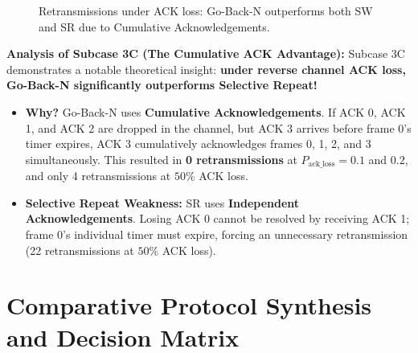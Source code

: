 \documentclass[11pt,a4paper]{article}
\begin{document}
\begin{figure}[H]
\centering
{}
\caption{Retransmissions under ACK loss: Go-Back-N outperforms both SW and SR due to Cumulative Acknowledgements.}
\label{fig:case3c_plot}
\end{figure}

\textbf{Analysis of Subcase 3C (The Cumulative ACK Advantage):}
Subcase 3C demonstrates a notable theoretical insight: \textbf{under reverse channel ACK loss, Go-Back-N significantly outperforms Selective Repeat!}
\begin{itemize}
    \item \textbf{Why?} Go-Back-N uses \textbf{Cumulative Acknowledgements}. If ACK 0, ACK 1, and ACK 2 are dropped in the channel, but ACK 3 arrives before frame 0's timer expires, ACK 3 cumulatively acknowledges frames 0, 1, 2, and 3 simultaneously. This resulted in \textbf{0 retransmissions} at $P_{\text{ack\_loss}} = 0.1$ and $0.2$, and only 4 retransmissions at $50\%$ ACK loss.
    \item \textbf{Selective Repeat Weakness:} SR uses \textbf{Independent Acknowledgements}. Losing ACK 0 cannot be resolved by receiving ACK 1; frame 0's individual timer must expire, forcing an unnecessary retransmission (22 retransmissions at $50\%$ ACK loss).
\end{itemize}

\FloatBarrier
\section{Comparative Protocol Synthesis and Decision Matrix}
\end{document}
